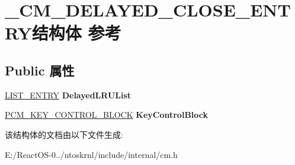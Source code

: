 \hypertarget{struct___c_m___d_e_l_a_y_e_d___c_l_o_s_e___e_n_t_r_y}{}\section{\+\_\+\+C\+M\+\_\+\+D\+E\+L\+A\+Y\+E\+D\+\_\+\+C\+L\+O\+S\+E\+\_\+\+E\+N\+T\+R\+Y结构体 参考}
\label{struct___c_m___d_e_l_a_y_e_d___c_l_o_s_e___e_n_t_r_y}
\subsection*{Public 属性}
\begin{DoxyCompactItemize}
\item 
\mbox{\label{struct___c_m___d_e_l_a_y_e_d___c_l_o_s_e___e_n_t_r_y_a9475c6f0debf2ce4c75d19fa17ab731e}} 
\hyperlink{struct___l_i_s_t___e_n_t_r_y}{L\+I\+S\+T\+\_\+\+E\+N\+T\+RY} {\bfseries Delayed\+L\+R\+U\+List}
\item 
\mbox{\label{struct___c_m___d_e_l_a_y_e_d___c_l_o_s_e___e_n_t_r_y_ac9b5864df622c17c7d6127d667196951}} 
\hyperlink{struct___c_m___k_e_y___c_o_n_t_r_o_l___b_l_o_c_k}{P\+C\+M\+\_\+\+K\+E\+Y\+\_\+\+C\+O\+N\+T\+R\+O\+L\+\_\+\+B\+L\+O\+CK} {\bfseries Key\+Control\+Block}
\end{DoxyCompactItemize}


该结构体的文档由以下文件生成\+:\begin{DoxyCompactItemize}
\item 
E\+:/\+React\+O\+S-\/0../ntoskrnl/include/internal/cm.\+h\end{DoxyCompactItemize}
